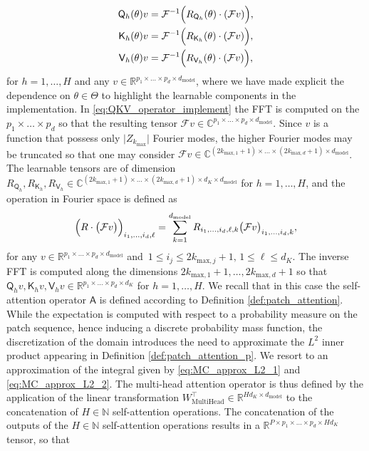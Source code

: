\documentclass[twoside]{article}
\newcommand{\1}{\mathbbm{1}}
\newcommand{\R}{\mathbbm{R}}
\newcommand{\C}{\mathbbm{C}}
\newcommand{\N}{\mathbbm{N}}
\newcommand{\sA}{\mathsf{A}}
\newcommand{\sQ}{\mathsf{Q}}
\newcommand{\sK}{\mathsf{K}}
\newcommand{\sV}{\mathsf{V}}
\newcommand{\cF}{\mathcal{F}}
\providecommand{\mathbbm}{\mathbb} %
\begin{document}
\begin{subequations}
\label{eq:QKV_operator_implement}
    \begin{align}
        \sQ_h(\theta){{v}} &= \cF^{-1}\Bigl(R_{\sQ_h}(\theta) \cdot (\cF{v}) \Bigr),\\
        \sK_h(\theta){v} &= \cF^{-1}\Bigl(R_{\sK_h}(\theta) \cdot (\cF{v}) \Bigr),\\
        \sV_h(\theta){v}  &= \cF^{-1}\Bigl(R_{\sV_h}(\theta) \cdot (\cF{v}) \Bigr),
    \end{align}
\end{subequations}
for $h=1,\ldots,H$ and any $v\in\R^{p_1\times\ldots\times p_d\times d_\textrm{model}}$, where we have made explicit the dependence on $\theta \in\Theta$ to highlight the learnable components in the implementation. In \eqref{eq:QKV_operator_implement} the FFT is computed on the $p_1\times\ldots\times p_d$ so that the resulting tensor $\cF{v}\in\C^{ p_1\times\ldots\times p_d\times d_{\textrm{model}}}$. Since ${v}$ is a function that possess only $\bigl|Z_{k_{\textrm{max}}} \bigr|$ Fourier modes, the higher Fourier modes may be truncated so that one may consider $\cF{v}\in\C^{ (2k_{\textrm{max},1}+1)\times\ldots\times (2k_{\textrm{max},d}+1)\times d_{\textrm{model}}}$. The learnable tensors are of dimension $R_{\sQ_h},R_{\sK_h},R_{\sV_h}\in\C^{(2k_{\textrm{max},1}+1)\times\ldots\times (2k_{\textrm{max},d}+1)\times d_{K}\times d_{\textrm{model}}}$ for $h=1,\ldots,H$, and the operation in Fourier space is defined as
\begin{equation}
    \Bigl(R\cdot\bigl(\cF{v}\bigr) \Bigr)_{i_1,\ldots,i_d, \ell} = \sum_{k=1}^{d_{\textrm{model}}} R_{i_1,\ldots,i_d, \ell,k} \bigl(\cF{v} \bigr)_{i_1,\ldots,i_d, k}       ,
\end{equation}
for any $v\in \R^{p_1\times\ldots\times p_d\times d_\textrm{model}}$ and $\,1\leq i_j\leq 2k_{\textrm{max},j}+1,\, 1\leq \ell\leq d_K $. The inverse FFT is computed along the dimensions $2k_{\textrm{max},1}+1,\ldots, 2k_{\textrm{max},d}+1$ so that $\sQ_h{v}, \sK_h{v}, \sV_h{v} \in \R^{ p_1\times \ldots\times p_d\times d_K}$ for $h=1,\ldots,H$. We recall that in this case the self-attention operator $\sA$ is defined according to Definition \ref{def:patch_attention}. While the expectation is computed with respect to a probability measure on the patch sequence, hence inducing a discrete probability mass function, the discretization of the domain introduces the need to approximate the $L^2$  inner product appearing in Definition \ref{def:patch_attention_p}. We resort to an approximation of the integral given by \eqref{eq:MC_approx_L2_1} and \eqref{eq:MC_approx_L2_2}. The multi-head attention operator is thus defined by the application of the linear transformation $W_{\textrm{MultiHead}}^\top\in \R^{Hd_K\times d_{\textrm{model}} }$ to the concatenation of $H\in\N$ self-attention operations. The concatenation of the outputs of the $H\in\N$ self-attention operations results in a $\R^{P\times p_1\times \ldots\times p_d\times Hd_K}$ tensor, so that 
\end{document}
